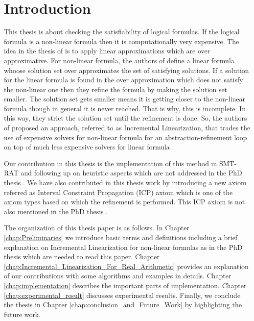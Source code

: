 \chapter{Introduction}
\label{chap:Introduction}
This thesis is about checking the satisfiability of logical formulas.
If the logical formula is a non-linear formula then it is computationally very expensive.
The idea in the thesis of \cite{Cimatti:2018:ILS:3274693.3230639} is to apply linear approximations which are over approximative.
For non-linear formula, the authors of \cite{Cimatti:2018:ILS:3274693.3230639} define a linear formula whoose solution set over approximates the set of satisfying solutions.
If a solution for the linear formula is found in the over approximation which does not satisfy the non-linear one then they refine the formula by making the solution set smaller.
The solution set gets smaller means it is getting closer to the non-linear formula though in general it is never reached.
That is why, this is incomplete.
In this way, they strict the solution set until the refinement is done.
So, the authors of \cite{Cimatti:2018:ILS:3274693.3230639} proposed an approach, referred to as Incremental Linearization, that trades the use of expensive solvers for non-linear
formula for an abstraction-refinement loop on top of much less expensive solvers for linear formula \cite{Cimatti:2018:ILS:3274693.3230639}.\newline

\noindent Our contribution in this thesis is the implementation of this method in SMT-RAT and following up on heuristic aspects which are not addressed in the PhD thesis \cite{irfan2018incremental}.
We have also contributed in this thesis work by introducing a new axiom referred as Interval Constraint Propagation (ICP) axiom which is one of the axiom types based on which the refinement is performed.
This ICP axiom is not also mentioned in the PhD thesis \cite{irfan2018incremental}.\newline

\noindent The organization of this thesis paper is as follows.
In Chapter \ref{chap:Preliminaries} we introduce basic terms and definitions including a brief explanation on Incremental Linearization for non-linear formulas as in the PhD thesis \cite{irfan2018incremental} which are needed to read this paper.
Chapter \ref{chap:Incremental_Linearization_For_Real_Arithmetic} provides an explanation of our contributions with some algorithms and examples in details.
Chapter \ref{chap:implementation} describes the important parts of implementation.
Chapter \ref{chap:experimental_result} discusses experimental results.
Finally, we conclude the thesis in Chapter \ref{chap:conclusion_and_Future_Work} by highlighting the future work.

